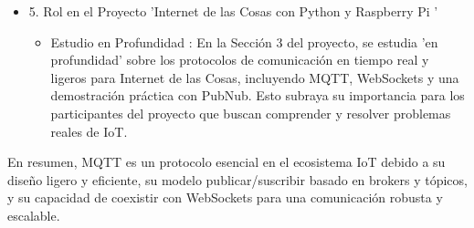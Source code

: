 \documentclass{report}
\begin{document}
\begin{itemize}
    \item 5. Rol en el Proyecto 'Internet de las Cosas con Python y Raspberry Pi '
    \begin{itemize}
        \item Estudio en Profundidad : En la Sección 3 del proyecto, se estudia   'en profundidad'  sobre los protocolos de comunicación en tiempo 
        real y ligeros para Internet de las Cosas, incluyendo MQTT, WebSockets y una demostración práctica con PubNub. Esto subraya su importancia 
        para los participantes del proyecto que buscan comprender y resolver problemas reales de IoT.
    \end{itemize}
\end{itemize}
En resumen, MQTT es un protocolo esencial en el ecosistema IoT debido a su diseño ligero y eficiente, su modelo publicar/suscribir basado en 
brokers y tópicos, y su capacidad de coexistir con WebSockets para una comunicación robusta y escalable.
\end{document}
